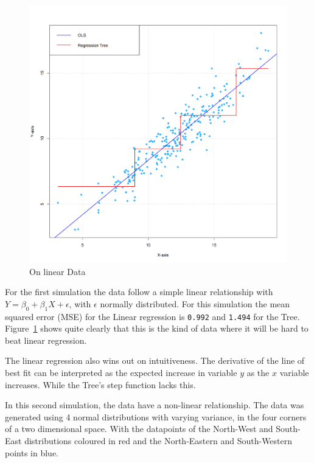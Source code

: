 \documentclass[12pt]{article}
\begin{document}
\begin{figure}
    \centering
    \includegraphics[scale=0.25]{OLS vs Tree.png}
    \caption{On linear Data}
    \label{OLS_VS_TREE}
\end{figure}

For the first simulation the data follow a simple linear relationship with $Y = \beta_0 + \beta_1X + \epsilon$, with $\epsilon$ normally distributed. For this simulation the mean squared error (MSE) for the Linear regression is \texttt{0.992} and \texttt{1.494} for the Tree. Figure~\ref{OLS_VS_TREE} shows quite clearly that this is the kind of data where it will be hard to beat linear regression.

The linear regression also wins out on intuitiveness. The derivative of the line of best fit can be interpreted as the expected increase in variable $y$ as the $x$ variable increases. While the Tree's step function lacks this.

In this second simulation, the data have a non-linear relationship. The data was generated using 4 normal distributions with varying variance, in the four corners of a two dimensional space. With the datapoints of the North-West and South-East distributions coloured in red and the North-Eastern and South-Western points in blue.
\end{document}
